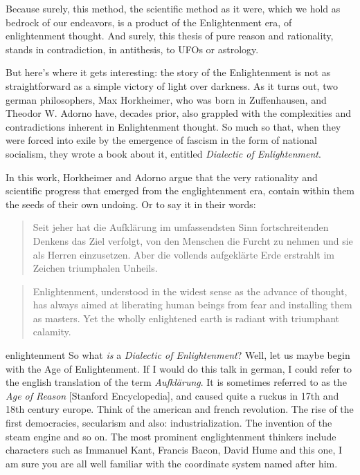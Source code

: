 Because surely, this method, the scientific
method as it were, which we hold as bedrock of our endeavors,
is a product of the Enlightenment era, of enlightenment
thought. And surely, this thesis of pure reason and rationality, stands in
contradiction, in antithesis, to UFOs or astrology.

But here’s where it gets interesting: the story of the Enlightenment is not as
straightforward as a simple victory of light over darkness. 
As it turns out, two german philosophers, Max Horkheimer, who was born in
Zuffenhausen, and Theodor W. Adorno have, decades prior, also grappled with the complexities and
contradictions inherent in Enlightenment thought. So
much so that, when they were forced into exile by the emergence of fascism in
the form of national socialism, they wrote a book about it, entitled
\emph{Dialectic of Enlightenment}.

In this work, Horkheimer and Adorno argue that the very rationality and
scientific progress that emerged from the englightenment era, contain within
them the seeds of their own undoing. Or to say it in their words:
\blockquote{
  Seit jeher hat die Aufklärung im umfassendsten Sinn fortschreitenden Denkens
  das Ziel verfolgt, von den Menschen die Furcht zu nehmen und sie als Herren
  einzusetzen. Aber die vollends aufgeklärte Erde erstrahlt im Zeichen
  triumphalen Unheils.
}
\blockquote{
Enlightenment, understood in the widest sense as the advance of
thought, has always aimed at liberating human beings from fear and
installing them as masters. Yet the wholly enlightened earth is radiant with
triumphant calamity. 
}

\par{enlightenment}
So what \emph{is} a \emph{Dialectic of Enlightenment}? Well, let us maybe begin
with the Age of Enlightenment. If I would do this talk in german, I could refer
to the english translation of the term \emph{Aufklärung}. It is sometimes
referred to as the \emph{Age of Reason} [Stanford Encyclopedia], and caused
quite a ruckus in 17th and 18th century europe. Think of the american and
french revolution. The rise of the first democracies, secularism and also:
industrialization. The invention of the steam engine and so on.
The most prominent
englightenment thinkers include characters such as Immanuel Kant, Francis
Bacon, David Hume and this one, I am sure you are all well familiar with the
coordinate system named after him.

